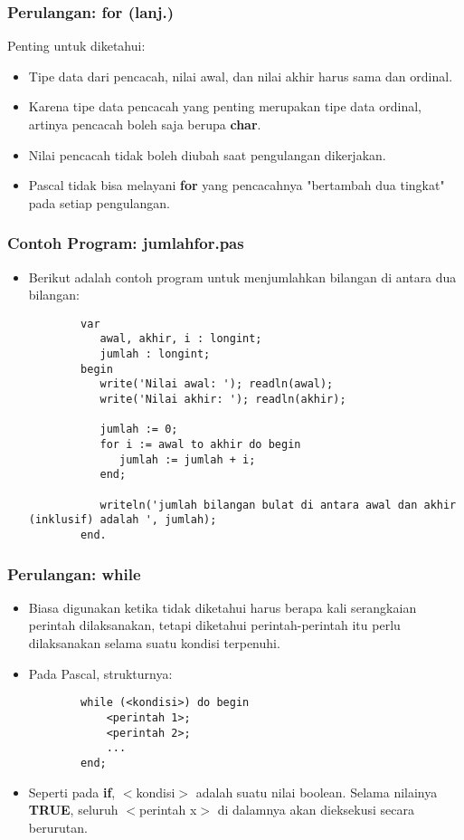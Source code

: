 \documentclass{beamer}
\begin{document}
\begin{frame}
\frametitle{Perulangan: for (lanj.)}
Penting untuk diketahui:
\begin{itemize}
	\item Tipe data dari pencacah, nilai awal, dan nilai akhir harus sama dan \alert{ordinal}.
	\item Karena tipe data pencacah yang penting merupakan tipe data ordinal, artinya pencacah boleh saja berupa \textbf{char}.
	\item Nilai pencacah tidak boleh diubah saat pengulangan dikerjakan.
	\item Pascal tidak bisa melayani \textbf{for} yang pencacahnya "bertambah dua tingkat" pada setiap pengulangan.
\end{itemize}
\end{frame}

\begin{frame}[fragile]
\frametitle{Contoh Program: jumlahfor.pas}
\begin{itemize}
	\item Berikut adalah contoh program untuk menjumlahkan bilangan di antara dua bilangan:
	\begin{lstlisting}
		var
		   awal, akhir, i : longint;
		   jumlah : longint;
		begin
		   write('Nilai awal: '); readln(awal);
		   write('Nilai akhir: '); readln(akhir);
		
		   jumlah := 0;
		   for i := awal to akhir do begin
		      jumlah := jumlah + i;
		   end;
		
		   writeln('jumlah bilangan bulat di antara awal dan akhir (inklusif) adalah ', jumlah);
		end.
	\end{lstlisting}
\end{itemize}
\end{frame}

\begin{frame}[fragile]
\frametitle{Perulangan: while}
\begin{itemize}
	\item Biasa digunakan ketika tidak diketahui harus berapa kali serangkaian perintah dilaksanakan, tetapi diketahui perintah-perintah itu perlu dilaksanakan selama suatu kondisi terpenuhi.
	\item Pada Pascal, strukturnya:
	\begin{lstlisting}
		while (<kondisi>) do begin
		    <perintah 1>;
		    <perintah 2>;
		    ...
		end;
	\end{lstlisting}
	\item Seperti pada \textbf{if}, $<$kondisi$>$ adalah suatu nilai boolean. Selama nilainya \textbf{TRUE}, seluruh $<$perintah x$>$ di dalamnya akan dieksekusi secara berurutan.
\end{itemize}
\end{frame}
\end{document}
